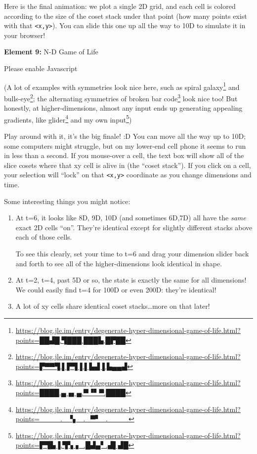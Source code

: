 \documentclass[]{article}
\renewcommand{\href}[2]{#2\footnote{\url{#1}}}
\begin{document}
Here is the final animation: we plot a single 2D grid, and each cell is colored
according to the size of the coset stack under that point (how many points exist
with that \texttt{\textless{}x,y\textgreater{}}). You can slide this one up all
the way to 10D to simulate it in your browser!

\leavevmode\hypertarget{golFlat}{}%
\textbf{Element 9:} N-D Game of Life

\leavevmode\hypertarget{golFlatCont}{}%
Please enable Javascript

(A lot of examples with symmetries look nice here, such as
\href{https://blog.jle.im/entry/degenerate-hyper-dimensional-game-of-life.html?points=██▟█.▜███.███▙.█▛██}{spiral
galaxy} and
\href{https://blog.jle.im/entry/degenerate-hyper-dimensional-game-of-life.html?points=▛▀▀▜.▌▛▜▐.▌▙▟▐.▙▄▄▟}{bulls-eye};
the alternating symmetries of
\href{https://blog.jle.im/entry/degenerate-hyper-dimensional-game-of-life.html?points=████.▄▗▖▄.▀▝▘▀.████}{broken
bar code} look nice too! But honestly, at higher-dimensions, almost any input
ends up generating appealing gradients, like
\href{https://blog.jle.im/entry/degenerate-hyper-dimensional-game-of-life.html?points=____._▝▖_._▀▘_.____}{glider}
and
\href{https://blog.jle.im/entry/degenerate-hyper-dimensional-game-of-life.html?points=▛▜▙▐.▜▚▗_.█▟▄▘.▟▌▟█}{my
own input})

Play around with it, it's the big finale! :D You can move all the way up to 10D;
some computers might struggle, but on my lower-end cell phone it seems to run in
less than a second. If you mouse-over a cell, the text box will show all of the
slice cosets where that xy cell is alive in (the ``coset stack''). If you click
on a cell, your selection will ``lock'' on that
\texttt{\textless{}x,y\textgreater{}} coordinate as you change dimensions and
time.

Some interesting things you might notice:

\begin{enumerate}
\def\labelenumi{\arabic{enumi}.}
\item
  At t=6, it looks like 8D, 9D, 10D (and sometimes 6D,7D) all have the
  \emph{same} exact 2D cells ``on''. They're identical except for slightly
  different stacks above each of those cells.

  To see this clearly, set your time to t=6 and drag your dimension slider back
  and forth to see all of the higher-dimensions look identical in shape.
\item
  At t=2, t=4, past 5D or so, the state is exactly the same for all dimensions!
  We could easily find t=4 for 100D or even 200D: they're identical!
\item
  A lot of xy cells share identical coset stacks\ldots more on that later!
\end{enumerate}
\end{document}
